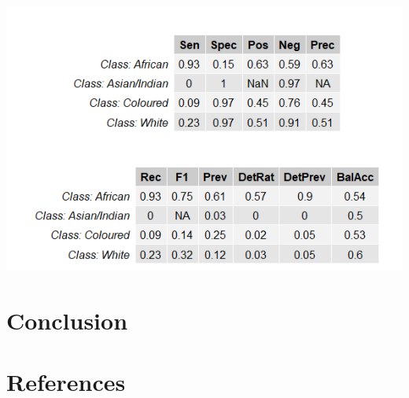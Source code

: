 \documentclass[11pt,preprint, authoryear]{elsarticle}
\let\origfigure\figure
\let\endorigfigure\endfigure
\renewenvironment{figure}[1][2] {
    \expandafter\origfigure\expandafter[H]
} {
    \endorigfigure
}
\numberwithin{equation}{section}
\numberwithin{figure}{section}
\numberwithin{table}{section}
\begin{document}
\begin{figure}
\centering
\includegraphics{"images/statsrf.png"}
\caption{Random Forest Statistics}
\end{figure}

\hypertarget{conclusion}{%
\section{Conclusion}\label{conclusion}}

\newpage

\hypertarget{references}{%
\section*{References}\label{references}}
\end{document}
